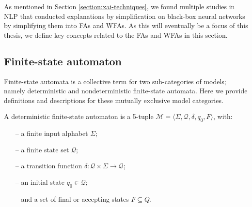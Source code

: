 As mentioned in Section \ref{section:xai-techniques}, we found multiple studies in NLP that conducted explanations by simplification on black-box neural networks by simplifying them into FAs and WFAs. As this will eventually be a focus of this thesis, we define key concepts related to the FAs and WFAs in this section.

\subsection{Finite-state automaton}

Finite-state automata is a collective term for two sub-categories of models; namely deterministic and nondeterministic finite-state automata. Here we provide definitions and descriptions for these mutually exclusive model categories.

\begin{definition}
  \label{def:fsa}
  A deterministic finite-state automaton is a 5-tuple $\mathcal{M} = \langle \Sigma, \mathcal{Q}, \delta, q_0, F \rangle$, with:
  \begin{itemize}
    \itemsep0em 
    \item[--] a finite input alphabet $\Sigma$;
    \item[--] a finite state set $\mathcal{Q}$;
    \item[--] a transition function $\delta: \mathcal{Q} \times \Sigma \rightarrow \mathcal{Q}$;
    \item[--] an initial state $q_0 \in \mathcal{Q}$; 
    \item[--] and a set of final or accepting states $F \subseteq Q$.
  \end{itemize}
\end{definition}

